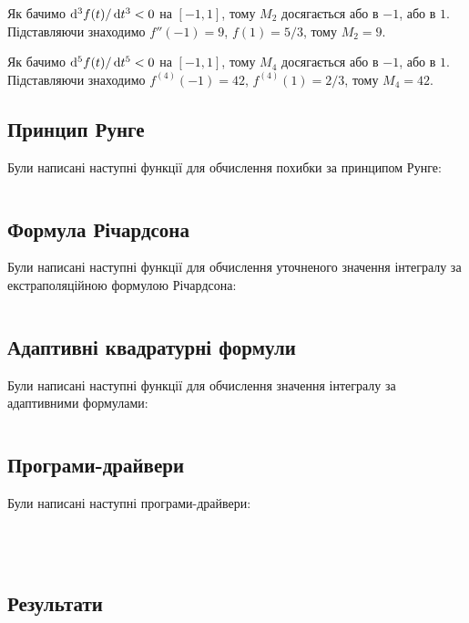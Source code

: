 Як бачимо $\mathop{}\!\mathrm{d}^3 f(t) / \mathop{}\!\mathrm{d} t^3 < 0$ на $[-1,1]$, тому $M_2$ досягається або в $-1$, або в $1$. Підставляючи знаходимо $f''(-1) = 9$, $f(1) = 5 / 3$, тому $M_2 = 9$. \medskip

Як бачимо $\mathop{}\!\mathrm{d}^5 f(t) / \mathop{}\!\mathrm{d} t^5 < 0$ на $[-1,1]$, тому $M_4$ досягається або в $-1$, або в $1$. Підставляючи знаходимо $f^{(4)}(-1) = 42$, $f^{(4)}(1) = 2 / 3$, тому $M_4 = 42$.

\subsection{Принцип Рунге}

Були написані наступні функції для обчислення похибки за принципом Рунге:

\inputminted[firstline=7]{python}{../py/runge.py}

\subsection{Формула Річардсона}

Були написані наступні функції для обчислення уточненого значення інтегралу за екстраполяційною формулою Річардсона:

\inputminted[firstline=7]{python}{../py/richardson.py}

\subsection{Адаптивні квадратурні формули}

Були написані наступні функції для обчислення значення інтегралу за адаптивними формулами:

\inputminted[firstline=8]{python}{../py/adaptive.py}

\subsection{Програми-драйвери}

Були написані наступні програми-драйвери:

\inputminted[firstline=11, lastline=21]{python}{../py/main.py}
\inputminted[firstline=40, lastline=50]{python}{../py/main.py}
\inputminted[firstline=69, lastline=79]{python}{../py/main.py}
\inputminted[firstline=98]{python}{../py/main.py}

\subsection{Результати}

